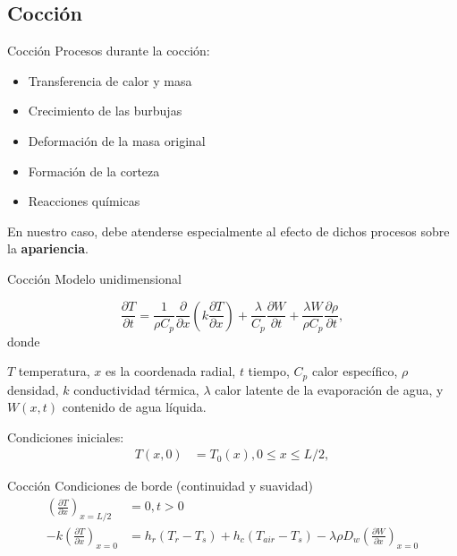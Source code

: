 \documentclass[spanish]{beamer}
\begin{document}
\subsection{Cocción}

\begin{frame}{Cocción}
Procesos durante la cocción:

\begin{itemize}
\item Transferencia de calor y masa
\item Crecimiento de las burbujas
\item Deformación de la masa original
\item Formación de la corteza
\item Reacciones químicas
\end{itemize}

En nuestro caso, debe atenderse especialmente al efecto de dichos procesos sobre la \textbf{apariencia}.

\end{frame}

\begin{frame}{Cocción}
Modelo unidimensional

\begin{equation}
\label{Eq:heat}
\frac{\partial T}{\partial t} = \frac{1}{\rho C_{p}} \frac{\partial}{\partial x} \left ( k \frac{\partial T}{\partial x} \right ) + \frac{\lambda}{C_{p}} \frac{\partial W}{\partial t}+\frac{\lambda W}{ \rho C_{p} }\frac{\partial \rho}{\partial t},
\end{equation}
%
\noindent donde

$T$ temperatura, $x$ es la coordenada radial, $t$ tiempo, $C_{p}$ calor específico, $\rho$ densidad, $k$ conductividad térmica, $\lambda$ calor latente de la evaporación de agua, y $W(x,t)$ contenido de agua líquida.

Condiciones iniciales:
\begin{align*}
T(x,0) &= T_{0}(x), 0\le x \le L/2,
\end{align*}

\end{frame}

\begin{frame}{Cocción}
Condiciones de borde (continuidad y suavidad)
\begin{align*}
\left ( \frac{\partial T}{\partial x} \right )_{x=L/2} &= 0 , t > 0 \\
-k \left ( \frac{\partial T}{\partial x} \right )_{x=0} &= h_{r}(T_{r}-T_{s}) + h_{c}(T_{air}-T_{s}) - \lambda \rho D_{w} \left (\frac{\partial W}{\partial x} \right )_{x=0}
\end{align*}
%

\end{frame}
\end{document}
